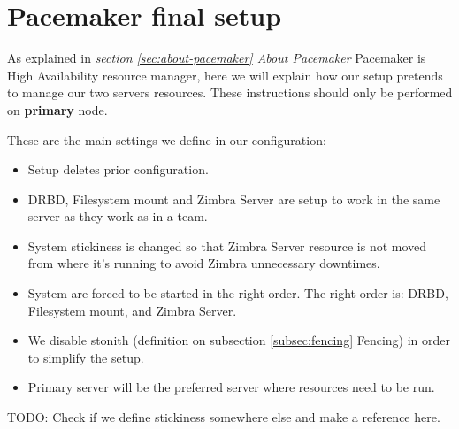 
\section {\label{sec:pacemaker-final-setup}Pacemaker final setup}
As explained in \textit{section \ref{sec:about-pacemaker} About Pacemaker} Pacemaker is High Availability resource manager, here we will explain how our setup pretends to manage our two servers resources. These instructions should only be performed on \textbf{primary} node.

These are the main settings we define in our configuration:
\begin{itemize}
  \item Setup deletes prior configuration.
  \item DRBD, Filesystem mount and Zimbra Server are setup to work in the same server as they work as in a team.
  \item System stickiness is changed so that Zimbra Server resource is not moved from where it's running to avoid Zimbra unnecessary downtimes.
  \item System are forced to be started in the right order. The right order is: DRBD, Filesystem mount, and Zimbra Server.
  \item We disable stonith (definition on subsection {\ref{subsec:fencing} Fencing}) in order to simplify the setup.
  \item Primary server will be the preferred server where resources need to be run.
\end{itemize}

TODO: Check if we define stickiness somewhere else and make a reference here.

